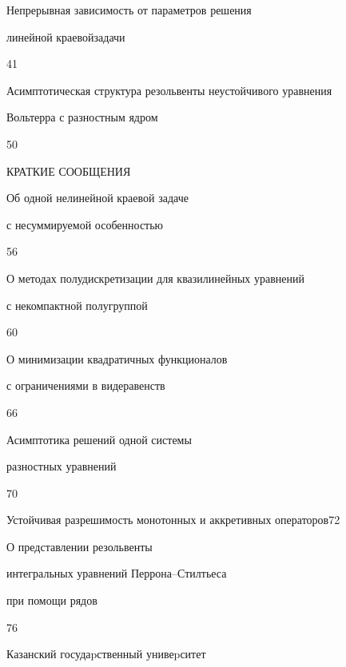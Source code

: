 

{Непрерывная зависимость от параметров решения


линейной краевой\newline задачи}{41}




{Асимптотическая структура резольвенты неустойчивого уравнения \newline


Вольтерра с разностным ядром}{50}





\bigskip


\par


\centerline{КРАТКИЕ СООБЩЕНИЯ}


\bigskip







{Об одной нелинейной краевой задаче


с несуммируемой особенностью}{56}




{О методах полудискретизации для квазилинейных уравнений\newline


с некомпактной полугруппой}{60}




{О минимизации квадратичных функционалов


с ограничениями в виде\newline равенств}{66}




{Асимптотика решений одной системы


разностных уравнений}{70}




{Устойчивая разрешимость монотонных и аккретивных операторов}{72}




{О представлении резольвенты


интегральных уравнений Перрона--Стилтьеса\newline


при помощи рядов}{76}








\vfill


\noindent\raisebox{2pt}{\copyright} Казанский госудаpственный унивеpситет





